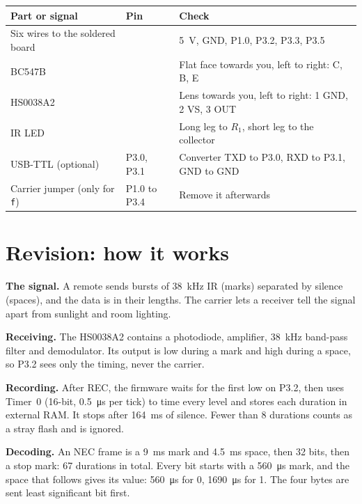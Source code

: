 \documentclass[11pt,a4paper]{article}
\newcommand{\code}[1]{\texttt{#1}}
\begin{document}
\begin{center}
\small
\begin{tabularx}{\textwidth}{@{}l l L@{}}
\toprule
Part or signal & Pin & Check\\
\midrule
Six wires to the soldered board & & \qty{5}{\volt}, GND, P1.0, P3.2, P3.3, P3.5\\
BC547B & & Flat face towards you, left to right: C, B, E\\
HS0038A2 & & Lens towards you, left to right: 1 GND, 2 VS, 3 OUT\\
IR LED & & Long leg to $R_1$, short leg to the collector\\
USB-TTL (optional) & P3.0, P3.1 & Converter TXD to P3.0, RXD to P3.1, GND to GND\\
Carrier jumper (only for \code{f}) & P1.0 to P3.4 & Remove it afterwards\\
\bottomrule
\end{tabularx}
\end{center}

\newpage
\section{Revision: how it works}

\textbf{The signal.} A remote sends bursts of \qty{38}{\kilo\hertz} IR (marks) separated by silence (spaces), and the data is in their lengths. The carrier lets a receiver tell the signal apart from sunlight and room lighting.

\textbf{Receiving.} The HS0038A2 contains a photodiode, amplifier, \qty{38}{\kilo\hertz} band-pass filter and demodulator. Its output is low during a mark and high during a space, so P3.2 sees only the timing, never the carrier.

\textbf{Recording.} After REC, the firmware waits for the first low on P3.2, then uses Timer~0 (16-bit, \qty{0.5}{\micro\second} per tick) to time every level and stores each duration in external RAM. It stops after \qty{164}{\milli\second} of silence. Fewer than 8 durations counts as a stray flash and is ignored.

\textbf{Decoding.} An NEC frame is a \qty{9}{\milli\second} mark and \qty{4.5}{\milli\second} space, then 32 bits, then a stop mark: 67 durations in total. Every bit starts with a \qty{560}{\micro\second} mark, and the space that follows gives its value: \qty{560}{\micro\second} for 0, \qty{1690}{\micro\second} for 1. The four bytes are sent least significant bit first.
\end{document}
